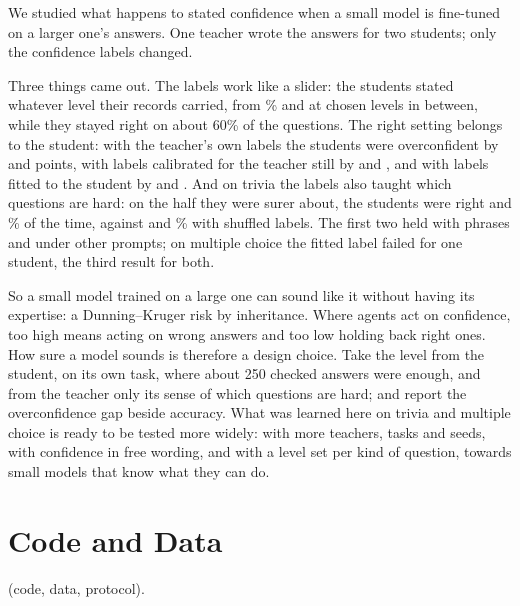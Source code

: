 \documentclass[10pt]{article}
\begin{document}
We studied what happens to stated confidence when a small model is fine-tuned on a larger one's answers. One teacher wrote the answers for two students; only the confidence labels changed.

Three things came out. The labels work like a slider: the students stated whatever level their records carried, from \dQGreedyConfRange{}\% and at chosen levels in between, while they stayed right on about 60\% of the questions. The right setting belongs to the student: with the teacher's own labels the students were overconfident by \dQRawGap{} and \dGRawGap{} points, with labels calibrated for the teacher still by \dQTcalGap{} and \dGTcalGap{}, and with labels fitted to the student by \dQScalGap{} and \dGScalGap{}. And on trivia the labels also taught which questions are hard: on the half they were surer about, the students were right \dQSelTcal{} and \dGSelTcal{}\% of the time, against \dQSelShuf{} and \dGSelShuf{}\% with shuffled labels. The first two held with phrases and under other prompts; on multiple choice the fitted label failed for one student, the third result for both.

So a small model trained on a large one can sound like it without having its expertise: a Dunning--Kruger risk by inheritance. Where agents act on confidence, too high means acting on wrong answers and too low holding back right ones. How sure a model sounds is therefore a design choice. Take the level from the student, on its own task, where about 250 checked answers were enough, and from the teacher only its sense of which questions are hard; and report the overconfidence gap beside accuracy. What was learned here on trivia and multiple choice is ready to be tested more widely: with more teachers, tasks and seeds, with confidence in free wording, and with a level set per kind of question, towards small models that know what they can do.


\section*{Code and Data}
\repoLink{} (code, data, protocol).
\end{document}
